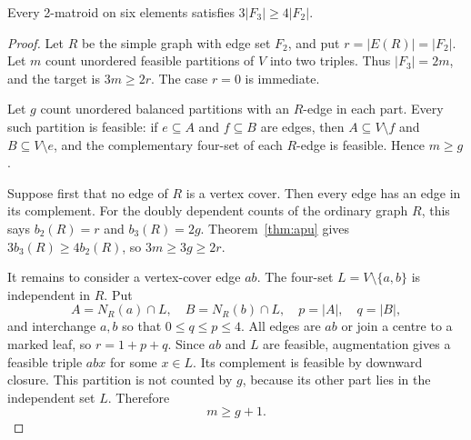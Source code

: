 \begin{lemma}\label{lem:two-matroid-six}
Every 2-matroid on six elements satisfies $3|F_3|\ge4|F_2|$.
\end{lemma}
\begin{proof}
Let $R$ be the simple graph with edge set $F_2$, and put $r=|E(R)|=|F_2|$.
Let $m$ count unordered feasible partitions of $V$ into two triples. Thus
$|F_3|=2m$, and the target is $3m\ge2r$. The case $r=0$ is immediate.

Let $g$ count unordered balanced partitions with an $R$-edge in each part.
Every such partition is feasible: if $e\subseteq A$ and $f\subseteq B$ are
edges, then $A\subseteq V\setminus f$ and $B\subseteq V\setminus e$, and
the complementary four-set of each $R$-edge is feasible. Hence $m\ge g$.

Suppose first that no edge of $R$ is a vertex cover. Then every edge has an
edge in its complement. For the doubly dependent counts of the ordinary
graph $R$, this says $b_2(R)=r$ and $b_3(R)=2g$. Theorem~\ref{thm:apu}
gives $3b_3(R)\ge4b_2(R)$, so $3m\ge3g\ge2r$.

It remains to consider a vertex-cover edge $ab$. The four-set
$L=V\setminus\{a,b\}$ is independent in $R$. Put
\[
A=N_R(a)\cap L,\quad B=N_R(b)\cap L,\quad p=|A|,\quad q=|B|,
\]
and interchange $a,b$ so that $0\le q\le p\le4$. All edges are $ab$ or
join a centre to a marked leaf, so $r=1+p+q$. Since $ab$ and $L$ are
feasible, augmentation gives a feasible triple $abx$ for some $x\in L$.
Its complement is feasible by downward closure. This partition is not
counted by $g$, because its other part lies in the independent set $L$.
Therefore
\begin{equation}\label{eq:two-matroid-extra}
m\ge g+1.
\end{equation}


\end{proof}
